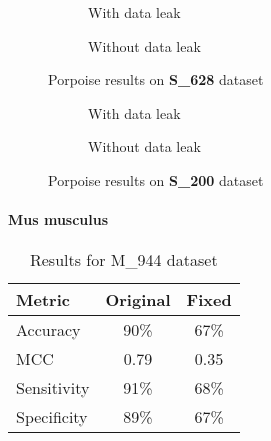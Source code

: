         \begin{figure}[H]
            \centering
            \begin{subfigure}{0.47\textwidth}
              \centering
              \resizebox{\textwidth}{!}{}
              \captionsetup{justification=centering}
              \caption{With data leak}
            \end{subfigure}%
            \hspace{0.05\textwidth}
            \begin{subfigure}{0.47\textwidth}
              \centering
              \resizebox{\textwidth}{!}{}
              \captionsetup{justification=centering}
              \caption{Without data leak}
            \end{subfigure}
            \caption{Porpoise results on \textbf{S\_628} dataset}\label{fig:pseu-st_s628}
        \end{figure}

        \begin{figure}[H]
            \centering
            \begin{subfigure}{0.45\textwidth}
              \centering
              \resizebox{\textwidth}{!}{}
              \captionsetup{justification=centering}
              \caption{With data leak}
            \end{subfigure}%
            \hspace{0.05\textwidth}
            \begin{subfigure}{0.45\textwidth}
              \centering
              \resizebox{\textwidth}{!}{}
              \captionsetup{justification=centering}
              \caption{Without data leak}
            \end{subfigure}
            \caption{Porpoise results on \textbf{S\_200} dataset}\label{fig:pseu-st_s200}
        \end{figure}

      \paragraph{Mus musculus}
        \noindent
        \begin{table}[H]
            \centering
            \begin{tabular}{lcc}
              \toprule
              \textbf{Metric} & \textbf{Original} & \textbf{Fixed} \\
              \midrule
              Accuracy        & 90\%              & 67\%           \\
              MCC             & 0.79              & 0.35           \\
              Sensitivity     & 91\%              & 68\%           \\
              Specificity     & 89\%              & 67\%           \\
              \bottomrule
            \end{tabular}
            \caption{Results for M\_944 dataset}
            \label{tab:pseu-st_pstnpss_mm}
        \end{table}

